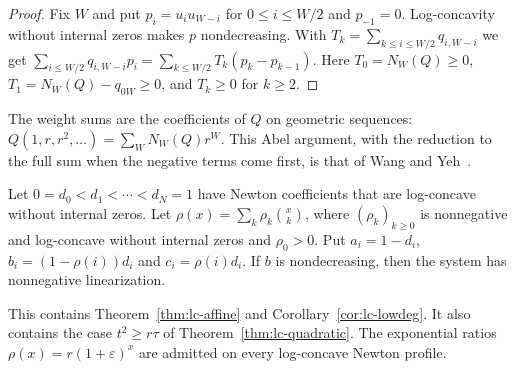 \begin{proof}
Fix $W$ and put $p_i=u_iu_{W-i}$ for $0\leq i\leq W/2$ and $p_{-1}=0$. Log-concavity without internal zeros makes $p$ nondecreasing. With $T_k=\sum_{k\leq i\leq W/2}q_{i,W-i}$ we get $\sum_{i\leq W/2}q_{i,W-i}p_i=\sum_{k\leq W/2}T_k(p_k-p_{k-1})$. Here $T_0=N_W(Q)\geq0$, $T_1=N_W(Q)-q_{0W}\geq0$, and $T_k\geq0$ for $k\geq2$.
\end{proof}

The weight sums are the coefficients of $Q$ on geometric sequences: $Q(1,r,r^2,\ldots)=\sum_WN_W(Q)r^W$. This Abel argument, with the reduction to the full sum when the negative terms come first, is that of Wang and Yeh~\cite[Lemma~2.1 and Corollary~2.6]{wangyeh}.

\begin{theorem}\label{thm:lc-general}
Let $0=d_0<d_1<\cdots<d_N=1$ have Newton coefficients that are log-concave without internal zeros. Let $\rho(x)=\sum_k\rho_k\binom xk$, where $(\rho_k)_{k\geq0}$ is nonnegative and log-concave without internal zeros and $\rho_0>0$. Put $a_i=1-d_i$, $b_i=(1-\rho(i))d_i$ and $c_i=\rho(i)d_i$. If $b$ is nondecreasing, then the system has nonnegative linearization.
\end{theorem}

This contains Theorem~\ref{thm:lc-affine} and Corollary~\ref{cor:lc-lowdeg}. It also contains the case $t^2\geq r\tau$ of Theorem~\ref{thm:lc-quadratic}. The exponential ratios $\rho(x)=r(1+\varepsilon)^x$ are admitted on every log-concave Newton profile.

